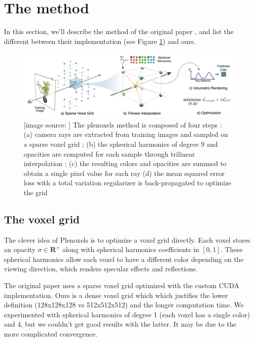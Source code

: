 \documentclass{article}
\begin{document}
\section{The method}

In this section, we'll describe the method of the original paper \cite{plenoxels}, and list the different between their implementation (see Figure \ref{fig:plenoxel}) and ours.



\begin{figure}[!h]
\centering
\includegraphics[width=1.\textwidth]{figs/plen_pipeline.png}
\caption{\label{fig:plenoxel} [image source: \cite{plenoxels}] The plenoxels method is composed of four steps : (a) camera rays are extracted from training images and sampled on a sparse voxel grid ; (b) the spherical harmonics of degree 9 and opacities are computed for each sample through trilinear interpolation ; (c) the resulting colors and opacities are summed to obtain a single pixel value for each ray (d) the mean squared error loss with a total variation regularizer is back-propagated to optimize the grid}
\end{figure}



\subsection{The voxel grid}

The clever idea of Plenoxels is to optimize a voxel grid directly. Each voxel stores an opacity $\sigma \in \mathbf{R}^+$ along with spherical harmonics coefficients in $[0,1]$. These spherical harmonics allow each voxel to have a different color depending on the viewing direction, which renders specular effects and reflections.

The original paper uses a sparse voxel grid optimized with the custom CUDA implementation. Ours is a dense voxel grid which which justifies the lower definition (128x128x128 vs 512x512x512) and the longer computation time. We experimented with spherical harmonics of degree 1 (each voxel has a single color)
and 4, but we couldn't get good results with the latter. It may be due to the more complicated convergence. 
\end{document}
